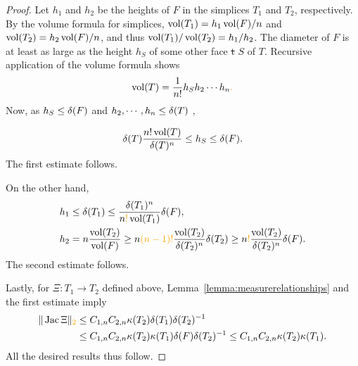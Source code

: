 \documentclass[10pt,letterpaper]{article}
\newcommand\cye[1]{%
  \protect\leavevmode
  \begingroup
    \color{red!35!yellow}%
    #1%
  \endgroup
}
\begin{document}
\begin{proof}
    Let $h_1$ and $h_2$ be the heights of $F$ in the simplices $T_1$ and $T_2$, respectively. 
    By the volume formula for simplices, $\operatorname{vol}(T_1) = h_1 \operatorname{vol}(F)/n$ and $\operatorname{vol}(T_2) = h_2 \operatorname{vol}(F)/n$, and thus $\operatorname{vol}(T_1)/\operatorname{vol}(T_2) = h_1/h_2$.
    The diameter of $F$ is at least as large as the height $h_S$ of some other face\cye{\sout{t}} $S$ of $T$. Recursive application of the volume formula shows 
    \begin{align*}
        \vol(T) = \frac{1}{n!} h_S h_2 \cdots h_n\cye{.}
    \end{align*}
    Now, \cye{as} $h_S \leq {\delta}(F)$ and $h_2, \cdots, h_n \leq {\delta}(T)$\cye{,} 
    \begin{align*}
        {\delta}(T) \frac{ n! \operatorname{vol}(T) }{ {\delta}(T)^{n} } \leq h_S \leq {\delta}(F).
    \end{align*}
    The first estimate follows. 

    On the other hand, 
    \begin{align*}
        h_1 &\leq \diam(T_1) \leq \frac{\diam(T_1)^{n}}{n\cye{!} \vol(T_1)} \diam(F),
        \\
        h_2 &= n \frac{\vol(T_2)}{\vol(F)} \geq n \cye{(n-1)!} \frac{\vol(T_2)}{\diam(T_2)^{n}} \diam(T_2) \geq n \cye{!} \frac{\vol(T_2)}{\diam(T_2)^{n}} \diam(F)
        .
    \end{align*}
    The second estimate follows. 

    Lastly, \cye{for} $\Xi : T_1 \rightarrow T_2$ \cye{defined} above, Lemma~\ref{lemma:measurerelationships} and the first estimate imply 
    \begin{align*}
        \| \Jacobian \Xi \|_{\cye{2}}
        &
        \leq 
        \Ceins{n}
        \Czwei{n}
        \kappa(T_2)
        \diam(T_1)
        \diam(T_2)^{-1}
        \\&
        \leq 
        \Ceins{n}
        \Czwei{n}
        \kappa(T_2)
        \kappa(T_1) 
        \diam(F)
        \diam(T_2)^{-1}
        \leq 
        \Ceins{n}
        \Czwei{n}
        \kappa(T_2)
        \kappa(T_1) 
        .
    \end{align*}
    All the desired results thus follow.
    

\end{proof}
\end{document}
